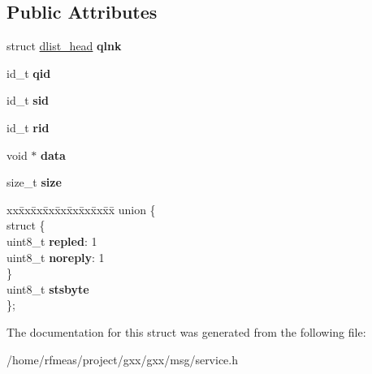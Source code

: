 \subsection*{Public Attributes}
\begin{DoxyCompactItemize}
\item 
struct \hyperlink{structdlist__head}{dlist\+\_\+head} {\bfseries qlnk}\hypertarget{structgxx_1_1msg_1_1message_aab131dd5ad50013aaa9533d8c9e52fd8}{}\label{structgxx_1_1msg_1_1message_aab131dd5ad50013aaa9533d8c9e52fd8}

\item 
id\+\_\+t {\bfseries qid}\hypertarget{structgxx_1_1msg_1_1message_a4a767f9e00d74609cc0149b1c5ab6e15}{}\label{structgxx_1_1msg_1_1message_a4a767f9e00d74609cc0149b1c5ab6e15}

\item 
id\+\_\+t {\bfseries sid}\hypertarget{structgxx_1_1msg_1_1message_a891bfe1dd56d0a3872dc939ec88a7b7d}{}\label{structgxx_1_1msg_1_1message_a891bfe1dd56d0a3872dc939ec88a7b7d}

\item 
id\+\_\+t {\bfseries rid}\hypertarget{structgxx_1_1msg_1_1message_a9f7dbcaaa75550bae2e30be1e898c1f9}{}\label{structgxx_1_1msg_1_1message_a9f7dbcaaa75550bae2e30be1e898c1f9}

\item 
void $\ast$ {\bfseries data}\hypertarget{structgxx_1_1msg_1_1message_af2eb72051f369534ff48d9bee835a8e8}{}\label{structgxx_1_1msg_1_1message_af2eb72051f369534ff48d9bee835a8e8}

\item 
size\+\_\+t {\bfseries size}\hypertarget{structgxx_1_1msg_1_1message_acf47c6903027b747773fa52f0e8188af}{}\label{structgxx_1_1msg_1_1message_acf47c6903027b747773fa52f0e8188af}

\item 
\begin{tabbing}
xx\=xx\=xx\=xx\=xx\=xx\=xx\=xx\=xx\=\kill
union \{\\
\>struct \{\\
\>\>uint8\_t {\bfseries repled}: 1\\
\>\>uint8\_t {\bfseries noreply}: 1\\
\>\} \hypertarget{uniongxx_1_1msg_1_1message_1_1_0D13_a2571da021d03942614b8fe4a8037394d}{}\label{uniongxx_1_1msg_1_1message_1_1_0D13_a2571da021d03942614b8fe4a8037394d}
\\
\>uint8\_t {\bfseries stsbyte}\\
\}; \hypertarget{structgxx_1_1msg_1_1message_ad031d3d452188d157b982d442158d6f2}{}\label{structgxx_1_1msg_1_1message_ad031d3d452188d157b982d442158d6f2}
\\

\end{tabbing}\end{DoxyCompactItemize}


The documentation for this struct was generated from the following file\+:\begin{DoxyCompactItemize}
\item 
/home/rfmeas/project/gxx/gxx/msg/service.\+h\end{DoxyCompactItemize}
